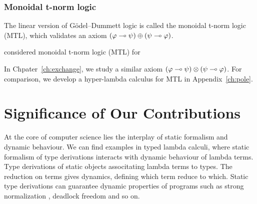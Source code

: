 \subsubsection{Monoidal t-norm logic}

The linear version of G\"odel--Dummett logic is called the monoidal
t-norm logic (MTL), which validates an axiom
$(\varphi\multimap\psi)\oplus(\psi\multimap\varphi)$.

\citet{Esteva2001271} considered monoidal t-norm logic (MTL) for

In Chpater~\ref{ch:exchange}, we study a similar axiom
$(\varphi\multimap\psi)\otimes(\psi\multimap\varphi)$.
For comparison, we develop a hyper-lambda calculus for MTL in
Appendix~\ref{ch:pole}.
















\section{Significance of Our Contributions}

At the core of computer science lies the interplay of static formalism
and dynamic behaviour.  We can find examples in typed lambda calculi,
where static formalism of type derivations interacts with dynamic
behaviour of lambda terms.
Type derivations of static objects associtating lambda terms to types.
The reduction on terms gives dynamics, defining which term reduce
to which.  Static type derivations can guarantee dynamic properties of
programs such as strong normalization ,
deadlock freedom 
and so on.

